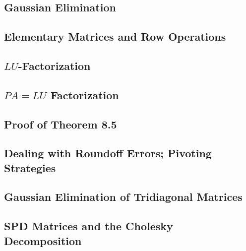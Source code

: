\documentclass[a4paper]{article}
\begin{document}
\subsection{ Gaussian Elimination} %

\subsection{ Elementary Matrices and Row Operations} %

\subsection{ $LU$-Factorization} %

\subsection{ $PA=LU$ Factorization} %

\subsection{ Proof of Theorem 8.5} %

\subsection{ Dealing with Roundoff Errors; Pivoting Strategies} %

\subsection{ Gaussian Elimination of Tridiagonal Matrices} %

\subsection{ SPD Matrices and the Cholesky Decomposition} %
\end{document}
